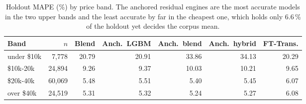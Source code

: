 \begin{table}[t]
\centering
\caption{Holdout MAPE (\%) by price band. The anchored residual engines are the most accurate models in the two upper bands and the least accurate by far in the cheapest one, which holds only 6.6\,\% of the holdout yet decides the corpus mean.}
\label{tab:bands}
\footnotesize\setlength{\tabcolsep}{4pt}
\begin{tabular}{lrrrrrr}
\toprule
Band & $n$ & Blend & Anch.\ LGBM & Anch.\ blend & Anch.\ hybrid & FT-Trans. \\
\midrule
under \$10k & 7,778 & 20.79 & 20.91 & 33.86 & 34.13 & 20.29 \\
\$10k-20k & 24,894 & 9.26 & 9.37 & 10.03 & 10.21 & 9.65 \\
\$20k-40k & 60,069 & 5.48 & 5.51 & 5.40 & 5.45 & 6.07 \\
over \$40k & 24,519 & 5.31 & 5.32 & 5.24 & 5.27 & 6.08 \\
\bottomrule
\end{tabular}
\end{table}
